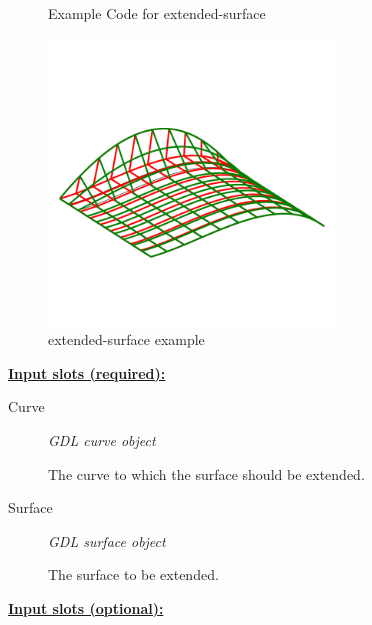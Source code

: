 \documentclass [11pt]{book}
\begin{document}
\begin{itemize}
\begin{figure}
\caption{Example Code for extended-surface}

\label{fig:example-code-extended-surface}

\end{figure}

\begin{figure}
\begin{center}
\includegraphics[width=3in,height=3in]{../images/example-extended-surface.pdf}
\end{center}

\caption{extended-surface example}

\label{fig:extended-surface}

\end{figure}





\textbf{
\underline{Input slots (required):}}

\begin{description}

\item [Curve]
\emph{GDL curve object}

 The curve to which the surface should be extended.




\item [Surface]
\emph{GDL surface object}

 The surface to be extended.




\end{description}






\textbf{
\underline{Input slots (optional):}}


\end{itemize}
\end{document}
